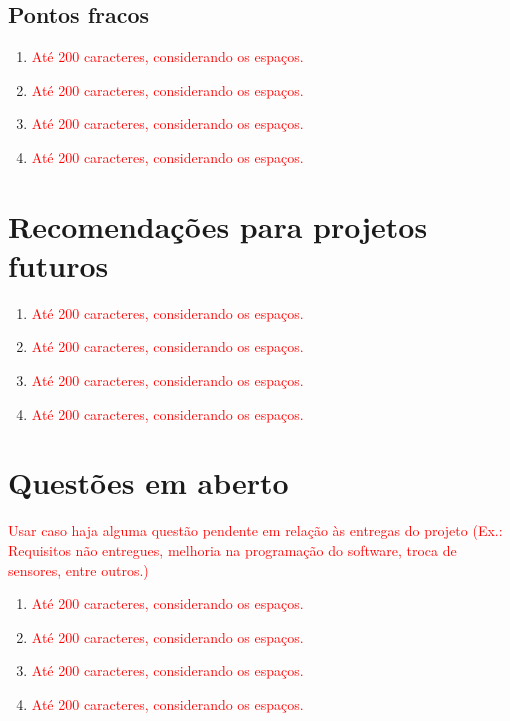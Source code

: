 \subsection{Pontos fracos}
\begin{enumerate}
	\item \textcolor{red}{Até 200 caracteres, considerando os espaços.}
	\item \textcolor{red}{Até 200 caracteres, considerando os espaços.}
	\item \textcolor{red}{Até 200 caracteres, considerando os espaços.}
	\item \textcolor{red}{Até 200 caracteres, considerando os espaços.}
\end{enumerate}

\section{Recomendações para projetos futuros}

\begin{enumerate}
	\item \textcolor{red}{Até 200 caracteres, considerando os espaços.}
	\item \textcolor{red}{Até 200 caracteres, considerando os espaços.}
	\item \textcolor{red}{Até 200 caracteres, considerando os espaços.}
	\item \textcolor{red}{Até 200 caracteres, considerando os espaços.}
\end{enumerate}

\section{Questões em aberto}

\textcolor{red}{Usar caso haja alguma questão pendente em relação às entregas do projeto (Ex.: Requisitos não entregues, melhoria na programação do software, troca de sensores, entre outros.)}

\begin{enumerate}
	\item \textcolor{red}{Até 200 caracteres, considerando os espaços.}
	\item \textcolor{red}{Até 200 caracteres, considerando os espaços.}
	\item \textcolor{red}{Até 200 caracteres, considerando os espaços.}
	\item \textcolor{red}{Até 200 caracteres, considerando os espaços.}
\end{enumerate}


